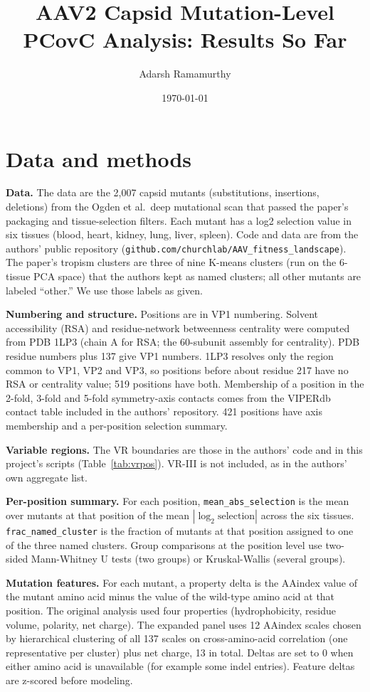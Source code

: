 \documentclass[11pt]{article}
\title{AAV2 Capsid Mutation-Level PCovC Analysis: Results So Far}
\author{Adarsh Ramamurthy}
\date{\today}
\begin{document}
\maketitle

\section{Data and methods}

\textbf{Data.} The data are the 2,007 capsid mutants (substitutions, insertions, deletions) from
the Ogden et al.\ deep mutational scan that passed the paper's packaging and tissue-selection
filters. Each mutant has a log2 selection value in six tissues (blood, heart, kidney, lung,
liver, spleen). Code and data are from the authors' public repository
(\texttt{github.com/churchlab/AAV\_fitness\_landscape}). The paper's tropism clusters are three
of nine K-means clusters (run on the 6-tissue PCA space) that the authors kept as named clusters;
all other mutants are labeled ``other.'' We use those labels as given.

\textbf{Numbering and structure.} Positions are in VP1 numbering. Solvent accessibility (RSA)
and residue-network betweenness centrality were computed from PDB 1LP3 \citep{xie2002}
(chain A for RSA; the 60-subunit assembly for centrality). PDB residue numbers plus 137 give VP1
numbers. 1LP3 resolves only the region common to VP1, VP2 and VP3, so positions before about
residue 217 have no RSA or centrality value; 519 positions have both. Membership of a position
in the 2-fold, 3-fold and 5-fold symmetry-axis contacts comes from the VIPERdb contact table
included in the authors' repository. 421 positions have axis membership and a per-position
selection summary.

\textbf{Variable regions.} The VR boundaries are those in the authors' code and in this
project's scripts (Table~\ref{tab:vrpos}). VR-III is not included, as in the authors' own
aggregate list.

\textbf{Per-position summary.} For each position, \texttt{mean\_abs\_selection} is the mean over
mutants at that position of the mean $|\log_2 \text{selection}|$ across the six tissues.
\texttt{frac\_named\_cluster} is the fraction of mutants at that position assigned to one of the
three named clusters. Group comparisons at the position level use two-sided Mann-Whitney U tests
(two groups) or Kruskal-Wallis (several groups).

\textbf{Mutation features.} For each mutant, a property delta is the AAindex value of the mutant
amino acid minus the value of the wild-type amino acid at that position. The original analysis
used four properties (hydrophobicity, residue volume, polarity, net charge). The expanded panel
uses 12 AAindex scales chosen by hierarchical clustering of all 137 scales on cross-amino-acid
correlation (one representative per cluster) plus net charge, 13 in total. Deltas are set to 0
when either amino acid is unavailable (for example some indel entries). Feature deltas are
z-scored before modeling.
\end{document}
